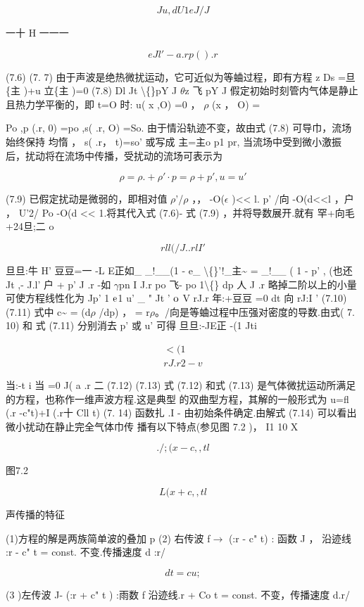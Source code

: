 \[Ju , dU 1 eJ/J\]

一十 H 一一一

\[eJ l ' - a.r p ().r\]

(7.6) (7. 7) 由于声波是绝热微扰运动，它可近似为等蛐过程，即有方程 z Ds =旦\{主 )+u 立\{主 )=0 (7.8) Dl Jt \textbackslash\{\}pY J $\theta$z 飞 pY J 假定初始时刻管内气体是静止且热力学平衡的，即 t=O 时: u( x ,O) =0 ， $\rho$ (x ， O) =

Po ,p (.r, 0) =po ,s( .r, O) =So. 由于情沿轨迹不变，故由式 (7.8) 可导巾，流场始终保持 均惰 ， s( .r， t)=so' 或写成 主=主o p1 pr, 当流场中受到微小激振后，扰动将在流场中传播，受扰动的流场可表示为

\[\rho =\rho .  +\rho '\cdot p=\rho  +p' ,  u=u'\]

(7.9) 已假定扰动是微弱的，即相对值 $\rho$'/$\rho$ ，， -O($\epsilon$ )<< l. p' /向 -O(d<<l ，户 ， U'2/ Po -O(d << 1.将其代入式 (7.6)- 式 (7.9) ，并将导数展开.就有 罕+向毛 +24旦;二 o

\[rll (/J. . rl I'\]

旦旦:牛 H' 豆豆=一 -L E正如\_ \_!\_\_(1 - e\_ \textbackslash\{\}'!\_主\textasciitilde{} = \_!\_\_ ( 1 - p' , (也还 Jt ,- J.l' 户 + p' J .r -如 $\gamma$pn I J.r po 飞- po 1\textbackslash\{\} dp 人 J .r 略掉二阶以上的小量可使方程线性化为 Jp' 1 ${\rm e}$1 u' \_ " Jt ' ${\rm o}$ V rJ.r 年:+豆豆 =0 dt 向 rJ:I ' (7.10) (7.11) 式中 c\textasciitilde{} = (d$\rho$ /dp) ， = r$\rho$。/向是等蛐过程中压强对密度的导数.由式( 7. 10) 和 式 (7.11) 分别消去 p' 或 u' 可得 旦旦:-JE正 -(1 Jti

\begin{gather*}
< (1\\
rJ.r2 - v
\end{gather*}

当:-t i 当 =0 J( a .r 二 (7.12) (7.13) 式 (7.12) 和式 (7.13) 是气体微扰运动所满足的方程，也称作一维声波方程.这是典型 的双曲型方程，其解的一般形式为 u=fl (.r -c"t)+I (.r十 Cll t) (7. 14) 函数扎 .I - 由初始条件确定.由解式 (7.14) 可以看出微小扰动在静止完全气体巾传 播有以下特点(参见图 7.2 )， I1 10 X

\[./; (x-c ,,t l\]

图7.2

\[L(x+c ,,t l\]

声传播的特征

(1)方程的解是两族简单波的叠加 p (2) 右传波 f$\rightarrow$ (:r - c" t) : 函数 J ， 沿迹线 :r - c" t = const. 不变.传播速度 d :r/

\[dt = cu ;\]

(3 )左传波 J- (:r + c" t ) :雨数 f 沿迹线.r + Co t = const. 不变，传播速度 d.r/

